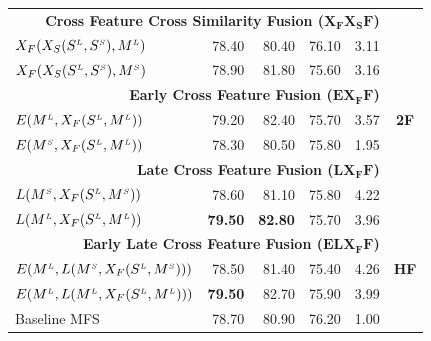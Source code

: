 \begin{table}[htp!]
\begin{tabular}{@{}lrrrrc@{}}
 \midrule
                   \multicolumn{5}{r}{\textbf{Cross Feature Cross Similarity Fusion ($\mathbf{X_FX_SF}$)}}  & \multirow{9}{*}{\textbf{2F}}     \\ %
	   
       $X_F(X_S(S^{\scriptscriptstyle L}, S^{\scriptscriptstyle S}), M^{\scriptscriptstyle L})$		& 78.40 & 80.40 & 76.10 & 3.11 \\	   
       $X_F(X_S(S^{\scriptscriptstyle L}, S^{\scriptscriptstyle S}), M^{\scriptscriptstyle S})$		& 78.90 & 81.80 & 75.60 & 3.16\\	   
                   \multicolumn{5}{r}{\textbf{Early Cross Feature Fusion ($\mathbf{EX_FF}$)}}       \\ %
       
       $E(M^{\scriptscriptstyle L}, X_F(S^{\scriptscriptstyle L}, M^{\scriptscriptstyle L}))$		& 79.20 & 82.40 & 75.70 & 3.57\\	   
	   $E(M^{\scriptscriptstyle S}, X_F(S^{\scriptscriptstyle L}, M^{\scriptscriptstyle L}))$		& 78.30 & 80.50 & 75.80 & 1.95\\	   
                   \multicolumn{5}{r}{\textbf{Late Cross Feature Fusion ($\mathbf{LX_FF}$)}}       \\ %
	   $L(M^{\scriptscriptstyle S}, X_F(S^{\scriptscriptstyle L}, M^{\scriptscriptstyle S}))$		& 78.60 & 81.10 & 75.80 & 4.22\\	   
	   $L(M^{\scriptscriptstyle L}, X_F(S^{\scriptscriptstyle L}, M^{\scriptscriptstyle L}))$		& \textbf{79.50} & \textbf{82.80} & 75.70 & 3.96\\	   
       \midrule
                   \multicolumn{5}{r}{\textbf{Early Late Cross Feature Fusion ($\mathbf{ELX_FF}$)}}     & \multirow{3}{*}{\textbf{HF}}  \\ %
	   $E(M^{\scriptscriptstyle L}, L(M^{\scriptscriptstyle S}, X_F(S^{\scriptscriptstyle L}, M^{\scriptscriptstyle S})))$		& 78.50 & 81.40 & 75.40 & 4.26\\	   
	   $E(M^{\scriptscriptstyle L}, L(M^{\scriptscriptstyle L}, X_F(S^{\scriptscriptstyle L}, M^{\scriptscriptstyle L})))$		& \textbf{79.50} & 82.70 & 75.90 & 3.99\\
	   \midrule
	   \midrule
	   

	   Baseline MFS		& 78.70 & 80.90 & 76.20 & 1.00\\ 	   	 	    
       \bottomrule
\end{tabular}
\end{table}


